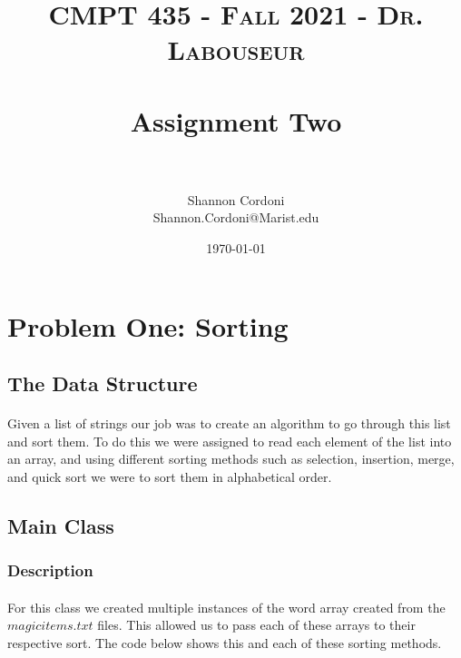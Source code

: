 \documentclass[letterpaper, 10pt,DIV=13]{scrartcl}
\title{	
   \normalfont \normalsize 
   \textsc{CMPT 435 - Fall 2021 - Dr. Labouseur} \\[10pt] %
   \horrule{0.5pt} \\[0.25cm] 	%
   \huge Assignment Two \\     	    %
   \horrule{0.5pt} \\[0.25cm] 	%
}
\author{Shannon Cordoni \\ \normalsize Shannon.Cordoni@Marist.edu}
\date{\normalsize\today} 	%
\numberwithin{equation}{section} %
\numberwithin{figure}{section} %
\numberwithin{table}{section} %
\begin{document}
\maketitle %

\section{Problem One: Sorting}

\subsection{The Data Structure}
\paragraph{} Given a list of strings our job was to create an algorithm to go through this list and sort them. To do this we were assigned to read each element of the list into an array, and using different sorting methods such as selection, insertion, merge, and quick sort we were to sort them in alphabetical order.\\


\subsection{Main Class}

\subsubsection{Description}
\paragraph{}For this class we created multiple instances of the word array created from the $magicitems.txt$ files. This allowed us to pass each of these arrays to their respective sort. The code below shows this and each of these sorting methods.
\end{document}
